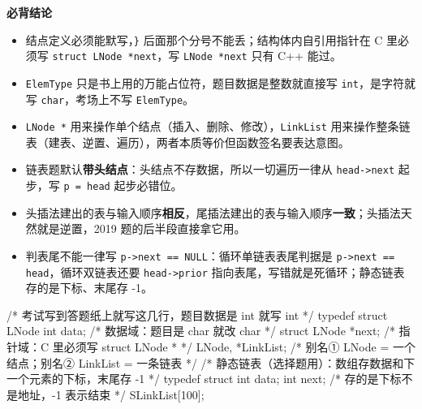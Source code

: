 \documentclass[10pt,a4paper]{ctexart}
\begin{document}




\textbf{必背结论}

\begin{itemize}

\item 结点定义必须能默写，\texttt{\}} 后面那个分号不能丢；结构体内自引用指针在 C 里必须写 \texttt{struct LNode *next}，写 \texttt{LNode *next} 只有 C++ 能过。

\item \texttt{ElemType} 只是书上用的万能占位符，题目数据是整数就直接写 \texttt{int}，是字符就写 \texttt{char}，考场上不写 \texttt{ElemType}。

\item \texttt{LNode *} 用来操作单个结点（插入、删除、修改），\texttt{LinkList} 用来操作整条链表（建表、逆置、遍历），两者本质等价但函数签名要表达意图。

\item 链表题默认\textbf{带头结点}：头结点不存数据，所以一切遍历一律从 \texttt{head->next} 起步，写 \texttt{p = head} 起步必错位。

\item 头插法建出的表与输入顺序\textbf{相反}，尾插法建出的表与输入顺序\textbf{一致}；头插法天然就是逆置，2019 题的后半段直接拿它用。

\item 判表尾不能一律写 \texttt{p->next == NULL}：循环单链表表尾判据是 \texttt{p->next == head}，循环双链表还要 \texttt{head->prior} 指向表尾，写错就是死循环；静态链表存的是下标、末尾存 -1。

\end{itemize}



\begin{codebox}
/* 考试写到答题纸上就写这几行，题目数据是 int 就写 int */
typedef struct LNode {
    int data;                  /* 数据域：题目是 char 就改 char */
    struct LNode *next;        /* 指针域：C 里必须写 struct LNode * */
} LNode, *LinkList;            /* 别名① LNode = 一个结点；别名② LinkList = 一条链表 */
/* 静态链表（选择题用）：数组存数据和下一个元素的下标，末尾存 -1 */
typedef struct {
    int data;
    int next;                  /* 存的是下标不是地址，-1 表示结束 */
} SLinkList[100];
\end{codebox}
\end{document}
